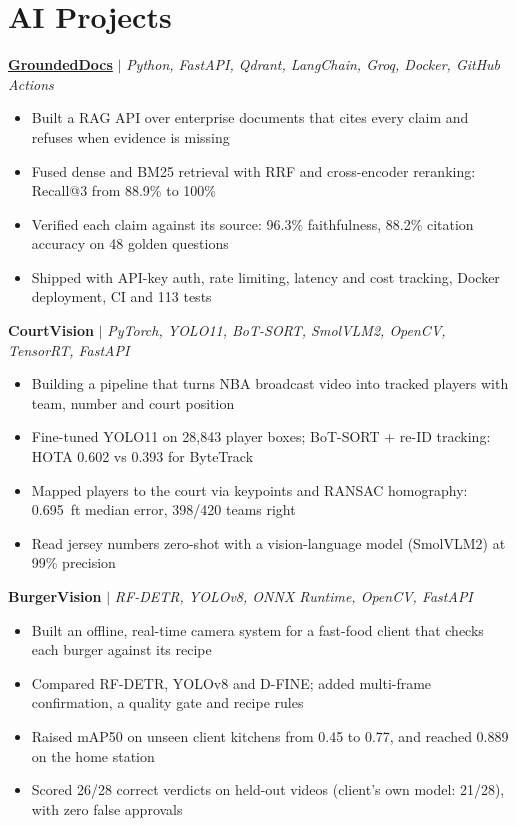 \documentclass[a4paper,11pt]{article}
\newenvironment{points}{\begin{itemize}[leftmargin=1.4em,itemsep=1pt,topsep=2pt,parsep=0pt]\small}{\end{itemize}\vspace{4pt}}
\newcommand{\proj}[2]{\textbf{#1} $|$ \textit{\small #2}\par}
\begin{document}
\section{AI Projects}
\proj{\href{https://github.com/ChedyKorbi/GroundedDocs}{GroundedDocs}}{Python, FastAPI, Qdrant, LangChain, Groq, Docker, GitHub Actions}
\begin{points}
  \item Built a RAG API over enterprise documents that cites every claim and refuses when evidence is missing
  \item Fused dense and BM25 retrieval with RRF and cross-encoder reranking: Recall@3 from 88.9\% to 100\%
  \item Verified each claim against its source: 96.3\% faithfulness, 88.2\% citation accuracy on 48 golden questions
  \item Shipped with API-key auth, rate limiting, latency and cost tracking, Docker deployment, CI and 113 tests
\end{points}
\proj{CourtVision}{PyTorch, YOLO11, BoT-SORT, SmolVLM2, OpenCV, TensorRT, FastAPI}
\begin{points}
  \item Building a pipeline that turns NBA broadcast video into tracked players with team, number and court position
  \item Fine-tuned YOLO11 on 28,843 player boxes; BoT-SORT + re-ID tracking: HOTA 0.602 vs 0.393 for ByteTrack
  \item Mapped players to the court via keypoints and RANSAC homography: 0.695~ft median error, 398/420 teams right
  \item Read jersey numbers zero-shot with a vision-language model (SmolVLM2) at 99\% precision
\end{points}
\proj{BurgerVision}{RF-DETR, YOLOv8, ONNX Runtime, OpenCV, FastAPI}
\begin{points}
  \item Built an offline, real-time camera system for a fast-food client that checks each burger against its recipe
  \item Compared RF-DETR, YOLOv8 and D-FINE; added multi-frame confirmation, a quality gate and recipe rules
  \item Raised mAP50 on unseen client kitchens from 0.45 to 0.77, and reached 0.889 on the home station
  \item Scored 26/28 correct verdicts on held-out videos (client's own model: 21/28), with zero false approvals
\end{points}
\end{document}
